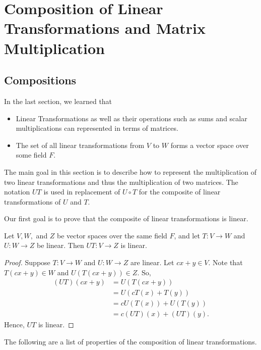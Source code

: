 \section{Composition of Linear Transformations and Matrix Multiplication}
\subsection{Compositions}
In the last section, we learned that
\begin{itemize}
    \item Linear Transformations as well as their operations such as sums and scalar multiplications can represented in terms of matrices.
    \item The set of all linear transformations from \( V  \) to \( W  \) forms a vector space over some field \( F   \).
\end{itemize}

The main goal in this section is to describe how to represent the multiplication of two linear transformations and thus the multiplication of two matrices. The notation \( UT \) is used in replacement of \( U \circ T  \) for the composite of linear transformations of \( U  \) and \( T  \).

Our first goal is to prove that the composite of linear transformations is linear.

\begin{theorem}\label{Composition is Linear}
   Let \( V, W,   \) and \( Z  \) be vector spaces over the same field \( F  \), and let \( T: V \to W  \) and \( U: W \to Z  \) be linear. Then \( UT: V \to Z  \) is linear.
\end{theorem}
\begin{proof}
    Suppose \( T: V \to W   \) and \( U: W \to Z  \) are linear. Let \( cx + y \in V  \). Note that \( T(cx+y) \in W  \) and \( U(T(cx+y)) \in Z \). So, 
    \begin{align*}
        (UT)(cx+y) &= U(T(cx+y)) \tag{Definition of Composition} \\
                   &= U(cT(x) + T(y)) \tag{\( T \) linear} \\
                   &= c U(T(x)) + U(T(y)) \tag{\( U \) linear} \\
                   &=  c (UT)(x) + (UT)(y). 
    \end{align*}
    Hence, \( UT  \) is linear.
\end{proof} 

The following are a list of properties of the composition of linear transformations.

